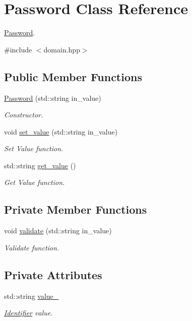 \hypertarget{classPassword}{}\section{Password Class Reference}
\label{classPassword}


\hyperlink{classPassword}{Password}.  




{\ttfamily \#include $<$domain.\+hpp$>$}

\subsection*{Public Member Functions}
\begin{DoxyCompactItemize}
\item 
\hyperlink{classPassword_aa312100d9cf5dcf061669c9541c09381}{Password} (std\+::string in\+\_\+value)
\begin{DoxyCompactList}\small\item\em Constructor. \end{DoxyCompactList}\item 
void \hyperlink{classPassword_ab191fc3ea0e630bfe9c5645d614e6b7e}{set\+\_\+value} (std\+::string in\+\_\+value)
\begin{DoxyCompactList}\small\item\em Set Value function. \end{DoxyCompactList}\item 
std\+::string \hyperlink{classPassword_a1be5c91ec171e21c1bcfc1c71765b8af}{get\+\_\+value} ()
\begin{DoxyCompactList}\small\item\em Get Value function. \end{DoxyCompactList}\end{DoxyCompactItemize}
\subsection*{Private Member Functions}
\begin{DoxyCompactItemize}
\item 
void \hyperlink{classPassword_a72bed398ebe53b92e5dfbc53ddd3a9a0}{validate} (std\+::string in\+\_\+value)
\begin{DoxyCompactList}\small\item\em Validate function. \end{DoxyCompactList}\end{DoxyCompactItemize}
\subsection*{Private Attributes}
\begin{DoxyCompactItemize}
\item 
std\+::string \hyperlink{classPassword_ae741ff7d079c6fcafd1fb1552684fe33}{value\+\_\+}
\begin{DoxyCompactList}\small\item\em \hyperlink{classIdentifier}{Identifier} value. \end{DoxyCompactList}\end{DoxyCompactItemize}
